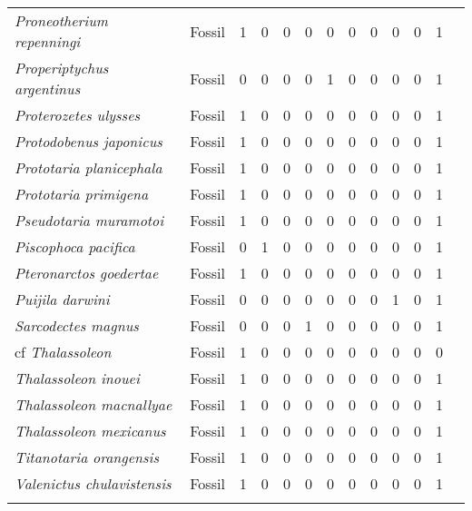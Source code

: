 \begin{longtable}{llccccccccccp{}}
\textit{Proneotherium repenningi} &
Fossil &
1 &
0 &
0 &
0 &
0 &
0 &
0 &
0 &
0 &
1 &
\\

\textit{Properiptychus argentinus} &
Fossil &
0 &
0 &
0 &
0 &
1 &
0 &
0 &
0 &
0 &
1 &
\\

\textit{Proterozetes ulysses} &
Fossil &
1 &
0 &
0 &
0 &
0 &
0 &
0 &
0 &
0 &
1 &
\\

\textit{Protodobenus japonicus} &
Fossil &
1 &
0 &
0 &
0 &
0 &
0 &
0 &
0 &
0 &
1 &
\\

\textit{Prototaria planicephala} &
Fossil &
1 &
0 &
0 &
0 &
0 &
0 &
0 &
0 &
0 &
1 &
\\

\textit{Prototaria primigena} &
Fossil &
1 &
0 &
0 &
0 &
0 &
0 &
0 &
0 &
0 &
1 &
\\

\textit{Pseudotaria muramotoi} &
Fossil &
1 &
0 &
0 &
0 &
0 &
0 &
0 &
0 &
0 &
1 &
\\

\textit{Piscophoca pacifica} &
Fossil &
0 &
1 &
0 &
0 &
0 &
0 &
0 &
0 &
0 &
1 &
\\

\textit{Pteronarctos goedertae} &
Fossil &
1 &
0 &
0 &
0 &
0 &
0 &
0 &
0 &
0 &
1 &
\\

\textit{Puijila darwini} &
Fossil &
0 &
0 &
0 &
0 &
0 &
0 &
0 &
1 &
0 &
1 &
\\

\textit{Sarcodectes magnus} &
Fossil &
0 &
0 &
0 &
1 &
0 &
0 &
0 &
0 &
0 &
1 &
\\

cf \textit{Thalassoleon}&
Fossil &
1 &
0 &
0 &
0 &
0 &
0 &
0 &
0 &
0 &
0 &
\\

\textit{Thalassoleon inouei} &
Fossil &
1 &
0 &
0 &
0 &
0 &
0 &
0 &
0 &
0 &
1 &
\\

\textit{Thalassoleon macnallyae} &
Fossil &
1 &
0 &
0 &
0 &
0 &
0 &
0 &
0 &
0 &
1 &
\\

\textit{Thalassoleon mexicanus} &
Fossil &
1 &
0 &
0 &
0 &
0 &
0 &
0 &
0 &
0 &
1 &
\\

\textit{Titanotaria orangensis} &
Fossil &
1 &
0 &
0 &
0 &
0 &
0 &
0 &
0 &
0 &
1 &
\\

\textit{Valenictus chulavistensis} &
Fossil &
1 &
0 &
0 &
0 &
0 &
0 &
0 &
0 &
0 &
1 &
\\
\hline

\label{table-biogeo-data}
\end{longtable}